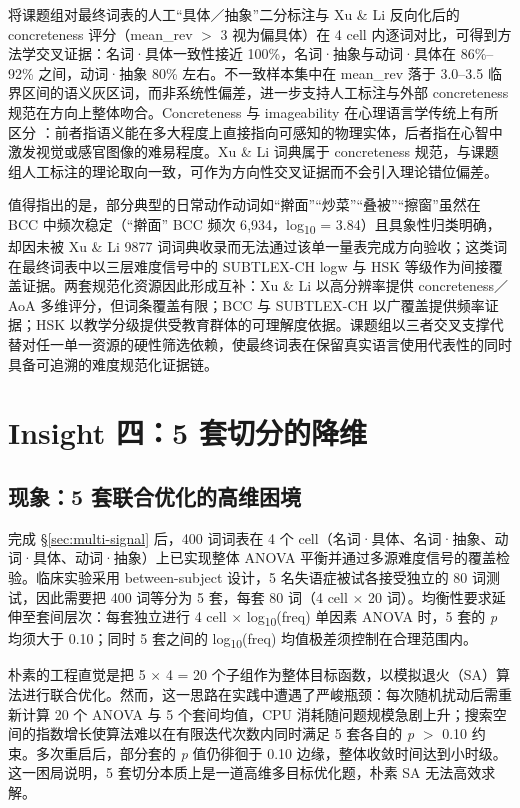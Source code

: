 \documentclass[12pt, a4paper]{article}
\begin{document}
将课题组对最终词表的人工“具体／抽象”二分标注与 Xu \& Li \cite{xu2020concreteness} 反向化后的 concreteness 评分（mean\_rev $>$ 3 视为偏具体）在 4 cell 内逐词对比，可得到方法学交叉证据：名词·具体一致性接近 100\%，名词·抽象与动词·具体在 86\%--92\% 之间，动词·抽象 80\% 左右。不一致样本集中在 mean\_rev 落于 3.0--3.5 临界区间的语义灰区词，而非系统性偏差，进一步支持人工标注与外部 concreteness 规范在方向上整体吻合。Concreteness 与 imageability 在心理语言学传统上有所区分 \cite{yao2017norms,wang2019imageability}：前者指语义能在多大程度上直接指向可感知的物理实体，后者指在心智中激发视觉或感官图像的难易程度。Xu \& Li 词典属于 concreteness 规范，与课题组人工标注的理论取向一致，可作为方向性交叉证据而不会引入理论错位偏差。

值得指出的是，部分典型的日常动作动词如“擀面”“炒菜”“叠被”“擦窗”虽然在 BCC 中频次稳定（“擀面” BCC 频次 6{,}934，log\textsubscript{10} = 3.84）且具象性归类明确，却因未被 Xu \& Li 9877 词词典收录而无法通过该单一量表完成方向验收；这类词在最终词表中以三层难度信号中的 SUBTLEX-CH logw 与 HSK 等级作为间接覆盖证据。两套规范化资源因此形成互补：Xu \& Li 以高分辨率提供 concreteness／AoA 多维评分，但词条覆盖有限；BCC 与 SUBTLEX-CH 以广覆盖提供频率证据；HSK 以教学分级提供受教育群体的可理解度依据。课题组以三者交叉支撑代替对任一单一资源的硬性筛选依赖，使最终词表在保留真实语言使用代表性的同时具备可追溯的难度规范化证据链。

\section{Insight 四：5 套切分的降维}
\label{sec:finding3}

\subsection{现象：5 套联合优化的高维困境}

完成 \S\ref{sec:multi-signal} 后，400 词词表在 4 个 cell（名词·具体、名词·抽象、动词·具体、动词·抽象）上已实现整体 ANOVA 平衡并通过多源难度信号的覆盖检验。临床实验采用 between-subject 设计，5 名失语症被试各接受独立的 80 词测试，因此需要把 400 词等分为 5 套，每套 80 词（4 cell $\times$ 20 词）。均衡性要求延伸至套间层次：每套独立进行 4 cell $\times$ log\textsubscript{10}(freq) 单因素 ANOVA 时，5 套的 \textit{p} 均须大于 0.10；同时 5 套之间的 log\textsubscript{10}(freq) 均值极差须控制在合理范围内。

朴素的工程直觉是把 5 $\times$ 4 = 20 个子组作为整体目标函数，以模拟退火（SA）算法进行联合优化。然而，这一思路在实践中遭遇了严峻瓶颈：每次随机扰动后需重新计算 20 个 ANOVA 与 5 个套间均值，CPU 消耗随问题规模急剧上升；搜索空间的指数增长使算法难以在有限迭代次数内同时满足 5 套各自的 \textit{p} $>$ 0.10 约束。多次重启后，部分套的 \textit{p} 值仍徘徊于 0.10 边缘，整体收敛时间达到小时级。这一困局说明，5 套切分本质上是一道高维多目标优化题，朴素 SA 无法高效求解。
\end{document}
